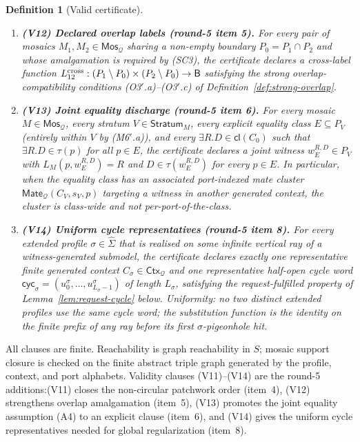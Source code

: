 \documentclass[11pt]{article}
\newtheorem{definition}[theorem]{Definition}
\newcommand{\Base}{\mathsf{B}}
\newcommand{\Cl}{\mathsf{cl}}
\newcommand{\Q}{\mathcal Q}
\newcommand{\Mos}{\mathsf{Mos}}
\newcommand{\Ctx}{\mathsf{Ctx}}
\newcommand{\Mate}{\mathsf{Mate}}
\newcommand{\Stratum}{\mathsf{Stratum}}
\newcommand{\extSigma}{\widehat\Sigma}
\begin{document}
\begin{definition}[Valid certificate]
\begin{enumerate}[label=(V\arabic*)]
\item \textbf{(V12) Declared overlap labels (round-5 item 5).}
  For every pair of mosaics $M_1,M_2\in\Mos_\Q$ sharing a non-empty
  boundary $P_0=P_1\cap P_2$ and whose amalgamation is required by
  (SC3), the certificate declares a cross-label function
  $L_{12}^{\rm cross}:(P_1\setminus P_0)\times(P_2\setminus P_0)\to
  \Base$ satisfying the strong overlap-compatibility conditions
  (O3$'$.a)--(O3$'$.c) of Definition~\ref{def:strong-overlap}.

\item \textbf{(V13) Joint equality discharge (round-5 item 6).}
  For every mosaic $M\in\Mos_\Q$, every stratum $V\in\Stratum_M$,
  every explicit equality class $E\subseteq P_V$ (entirely within
  $V$ by (M6$'$.a)), and every $\exists R.D\in\Cl(C_0)$ such that
  $\exists R.D\in\tau(p)$ for all $p\in E$, the certificate declares
  a joint witness $w_E^{R,D}\in P_V$ with $L_M(p,w_E^{R,D})=R$ and
  $D\in\tau(w_E^{R,D})$ for every $p\in E$.  In particular, when
  the equality class has an associated port-indexed mate cluster
  $\Mate_\Q(C_V,s_V,p)$ targeting a witness in another generated
  context, the cluster is class-wide and not per-port-of-the-class.

\item \textbf{(V14) Uniform cycle representatives (round-5 item 8).}
  For every extended profile $\sigma\in\extSigma$ that is realised
  on some infinite vertical ray of a witness-generated submodel,
  the certificate declares exactly one representative finite
  generated context $C_\sigma\in\Ctx_\Q$ and one representative
  half-open cycle word
  $\mathsf{cyc}_\sigma=(u_0^\sigma,\ldots,u_{L_\sigma-1}^\sigma)$ of
  length $L_\sigma$, satisfying the request-fulfilled property of
  Lemma~\ref{lem:request-cycle} below.  Uniformity: no two distinct
  extended profiles use the same cycle word; the substitution
  function is the identity on the finite prefix of any ray before
  its first $\sigma$-pigeonhole hit.
\end{enumerate}
\end{definition}

All clauses are finite.  Reachability is graph reachability in $S$;
mosaic support closure is checked on the finite abstract triple graph
generated by the profile, context, and port alphabets.  Validity
clauses (V11)--(V14) are the round-5 additions:\@ (V11) closes the
non-circular patchwork order (item~4), (V12) strengthens overlap
amalgamation (item~5), (V13) promotes the joint equality assumption
(A4) to an explicit clause (item~6), and (V14) gives the uniform
cycle representatives needed for global regularization (item~8).
\end{document}
